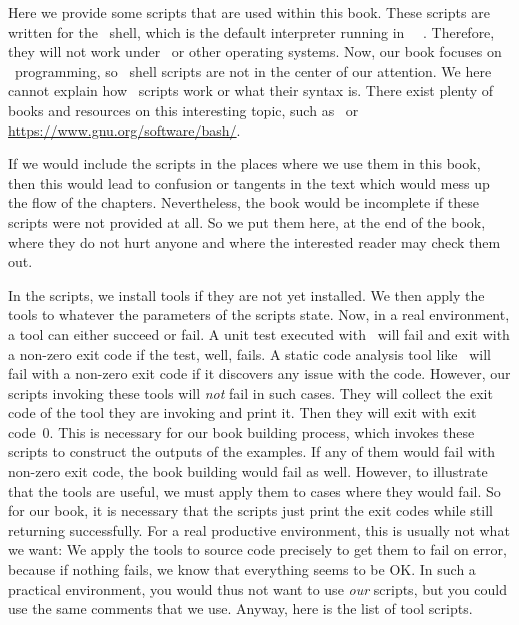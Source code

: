 %
%
%
%
%
%
%
%
%
%
Here we provide some scripts that are used within this book.
These scripts are written for the \bash\ shell, which is the default interpreter running in \ubuntu\ \linux\ .
Therefore, they will not work under \windows\ or other operating systems.
Now, our book focuses on \python\ programming, so \bash\ shell scripts are not in the center of our attention.
We here cannot explain how \bash\ scripts work or what their syntax is.
There exist plenty of books and resources on this interesting topic, such as~\cite{NR2005LTBSUSPCB3,Z2017MB,BN2018BC} or \url{https://www.gnu.org/software/bash/}.

If we would include the scripts in the places where we use them in this book, then this would lead to confusion or tangents in the text which would mess up the flow of the chapters.
Nevertheless, the book would be incomplete if these scripts were not provided at all.
So we put them here, at the end of the book, where they do not hurt anyone and where the interested reader may check them out.

In the scripts, we install tools if they are not yet installed.
We then apply the tools to whatever the parameters of the scripts state.
Now, in a real environment, a tool can either succeed or fail.
A unit test executed with \pytest\ will fail and exit with a non-zero exit code if the test, well, fails.
A static code analysis tool like \ruff\ will fail with a non-zero exit code if it discovers any issue with the code.
However, our scripts invoking these tools will \emph{not} fail in such cases.
They will collect the exit code of the tool they are invoking and print it.
Then they will exit with exit code~0.
This is necessary for our book building process, which invokes these scripts to construct the outputs of the examples.
If any of them would fail with non-zero exit code, the book building would fail as well.
However, to illustrate that the tools are useful, we must apply them to cases where they would fail.
So for our book, it is necessary that the scripts just print the exit codes while still returning successfully.
For a real productive environment, this is usually not what we want:
We apply the tools to source code precisely to get them to fail on error, because if nothing fails, we know that everything seems to be OK.
In such a practical environment, you would thus not want to use \emph{our} scripts, but you could use the same comments that we use.
Anyway, here is the list of tool scripts.


